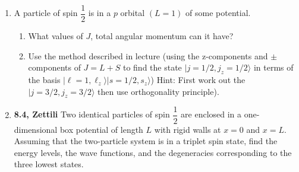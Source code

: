 \documentclass[fleqn]{article}
\begin{document}
  \begin{enumerate}
    \item A particle of spin $\dfrac{1}{2}$ is in a $p$ orbital $(L=1)$ of some potential.
    \begin{enumerate}
      \item What values of $J$, total angular momentum can it have?


      \item Use the method described in lecture (using the z-components and $\pm$ components of $J=L+S$
      to find the state $|j=1/2, j_z=1/2 \rangle$ in terms of the basis $|\ell=1, \ell_z \rangle|s=1/2, s_z \rangle$)
      Hint: First work out the $|j=3/2, j_z=3/2 \rangle$ then use orthogonality principle).


    \end{enumerate}

    \item \textbf{8.4, Zettili} Two identical particles of spin $\dfrac{1}{2}$ are enclosed in a one-dimensional 
    box potential of length $L$ with rigid walls at $x=0$ and $x=L$. Assuming that the two-particle system
    is in a triplet spin state, find the energy levels, the wave functions, and the degeneracies corresponding 
    to the three lowest states.


  \end{enumerate}
\end{document}
